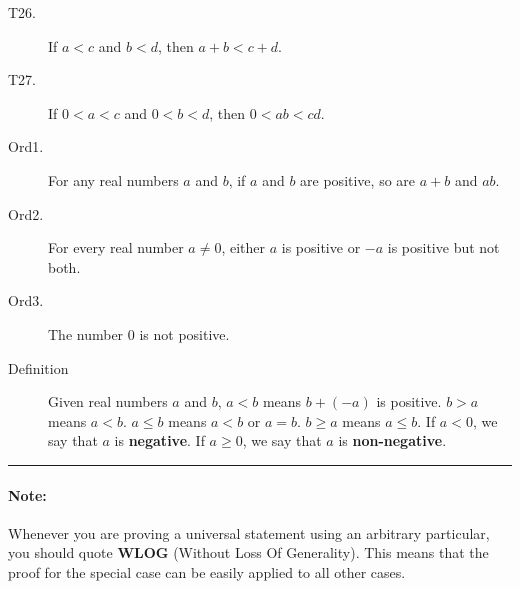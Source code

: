 \documentclass{article}
\begin{document}
\begin{multicols*}{2}
\begin{description}
        \item[T26.]If $a<c$ and $b<d$, then $a+b<c+d$.
        \item[T27.]If $0<a<c$ and $0<b<d$, then $0<ab<cd$.
        \item[Ord1.]For any real numbers $a$ and $b$, if $a$ and $b$ are positive, so are $a+b$ and $ab$. 
        \item[Ord2.]For every real number $a\neq 0$, either $a$ is positive or $-a$ is positive but not both.
        \item[Ord3.]The number 0 is not positive. 
        \item[Definition]Given real numbers $a$ and $b$, $a < b$ means $b + (-a)$ is positive. $b > a$ means $a < b$. $a\leq b$ means $a < b$ or $a=b$. $b\geq a$ means $a\leq b$. If $a < 0$, we say that $a$ is \textbf{negative}. If $a \geq 0$, we say that $a$ is \textbf{non-negative}.
    \end{description}
    \hrule

    \paragraph{Note:} Whenever you are proving a universal statement using an arbitrary particular, you should quote \textbf{WLOG} (Without Loss Of Generality). This means that the proof for the special case can be easily applied to all other cases. 
\end{multicols*}


\newcommand{\iterate}[2]{$#1_{1}, #1_{2},\dots,#1_{#2}$} %

\newpage
\end{document}
